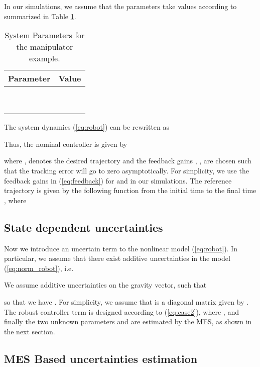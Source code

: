 \documentclass[twoside,leqno,onecolumn]{article}
\begin{document}
In our simulations, we assume that the parameters take values according to \cite{Spong92} summarized in Table \ref{tab:robot}.
\begin{table}
\caption{System Parameters for the manipulator example.}
\label{tab:robot}
\centering
\begin{tabular}{|c|c|}
  \hline
Parameter & Value \\\hline
   &  \\\hline
   &  \\\hline
   & \\\hline
   &  \\\hline
   &  \\\hline
   &  \\\hline
    & \\\hline
   &  \\\hline
   &  \\
  \hline
\end{tabular}
\end{table}
The system dynamics (\ref{eq:robot}) can be rewritten as

Thus, the nominal controller is given by

where , denotes the desired trajectory and the feedback gains , , are chosen such that the tracking error will go to zero asymptotically. For simplicity, we use the feedback gains  in (\ref{eq:feedback}) for  and  in our simulations.
The reference trajectory is given by the following function from the initial time  to the final time , where

\subsection{State dependent uncertainties}
Now we introduce an uncertain term to the nonlinear model
(\ref{eq:robot}). In particular, we assume that there exist
additive uncertainties in the model (\ref{eq:norm_robot}), i.e.

We assume additive uncertainties on the gravity vector, such that

so that we have .  For
simplicity, we assume that  is a diagonal matrix given by
. The robust controller
term  is designed according to (\ref{eq:case2}), where
, and finally the two unknown parameters
 and  are estimated by the MES, as shown in
the next section.

\subsection{MES Based uncertainties estimation}
\label{sec:constant}
\end{document}
